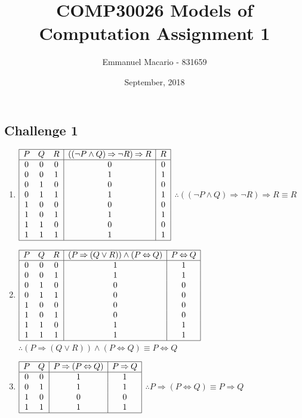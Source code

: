 \documentclass[12pt]{article}
\author{Emmanuel Macario - 831659}
\title{COMP30026 Models of Computation Assignment 1}
\date{September, 2018}
\newcommand{\impl}{\mathbin{\Rightarrow}}
\newcommand{\biim}{\mathbin{\Leftrightarrow}}
\begin{document}
\maketitle

\subsection*{Challenge 1}
\begin{enumerate}
\item 
$\begin{array}{|ccc|c|c|}
   \hline
   P & Q & R & ((\neg P \land Q) \impl \neg R) \impl R & R
\\ \hline
    0 & 0 & 0 & 0 & 0
\\ 0 & 0 & 1 & 1 & 1
\\ 0 & 1 & 0 & 0 & 0
\\ 0 & 1 & 1 & 1 & 1
\\ 1 & 0 & 0 & 0 & 0
\\ 1 & 0 & 1 & 1 & 1
\\ 1 & 1 & 0 & 0 & 0
\\ 1 & 1 & 1 & 1 & 1
\\ \hline
\end{array}$
$\therefore ((\neg P \land Q) \impl \neg R) \impl R \equiv R$
\bigskip

\item 
$\begin{array}{|ccc|c|c|}
   \hline
   P & Q & R & (P \impl (Q \lor R)) \land (P \biim Q) & P \biim Q
\\ \hline
    0 & 0 & 0 & 1 & 1
\\ 0 & 0 & 1 & 1 & 1
\\ 0 & 1 & 0 & 0 & 0
\\ 0 & 1 & 1 & 0 & 0
\\ 1 & 0 & 0 & 0 & 0
\\ 1 & 0 & 1 & 0 & 0
\\ 1 & 1 & 0 & 1 & 1
\\ 1 & 1 & 1 & 1 & 1
\\ \hline
\end{array}$
$\therefore (P \impl (Q \lor R)) \land (P \biim Q) \equiv P \biim Q$
\bigskip

\item
$\begin{array}{|cc|c|c|}
   \hline
   P & Q & P \impl (P \biim Q) & P \impl Q
\\ \hline
    0 & 0 & 1 & 1
\\ 0 & 1 & 1 & 1
\\ 1 & 0 & 0 & 0
\\ 1 & 1 & 1 & 1
\\ \hline
\end{array}$
$\therefore P \impl (P \biim Q) \equiv P \impl Q$
\bigskip


\end{enumerate}
\end{document}
